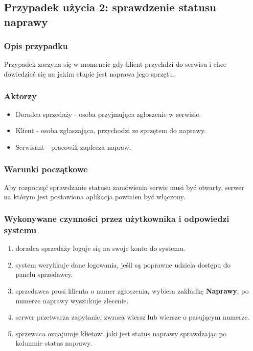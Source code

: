 \documentclass{article}
\begin{document}
\subsection{Przypadek użycia 2: sprawdzenie statusu naprawy}
\subsubsection{Opis przypadku}
Przypadek zaczyna się w momencie gdy klient przychdzi do serwisu i chce dowiedzieć się na jakim etapie jest naprawa jego sprzętu.
\subsubsection{Aktorzy}
\begin{itemize}
    \item Doradca sprzedaży - osoba przyjmująca zgłoszenie w serwisie.
    \item Klient - osoba zgłaszająca, przychodzi ze sprzętem do naprawy.
    \item Serwisant - pracowik zaplecza napraw.
\end{itemize}
\subsubsection{Warunki początkowe}
Aby rozpocząć sprawdzanie statusu zamówienia serwis musi być otwarty, serwer na którym jest postawiona aplikacja powinien być włączony.
\subsubsection{Wykonywane czynności przez użytkownika i odpowiedzi systemu}
\begin{enumerate}
    \item doradca sprzedaży loguje się na swoje konto do systemu.
    \item system weryfikuje dane logowania, jeśli są poprawne udziela dostępu do panelu sprzedawcy.
    \item sprzedawca prosi klienta o numer zgłoszenia, wybiera zakładkę \textbf{Naprawy}, po numerze naprawy wyszukuje zlecenie.
    \item serwer przetwarza zapytanie, zwraca wiersz lub wiersze o pasującym numerze.
    \item sprzewaca oznajumje klietowi jaki jest status naprawy sprawdzając po kolumnie status naprawy.
\end{enumerate}
\end{document}

